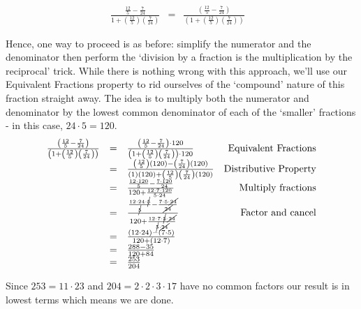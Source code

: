\documentclass{ximera}
\begin{document}
\begin{example}
\begin{enumerate}
\[\begin{array}{rclr}
\frac{\frac{12}{5} - \frac{7}{24}}{1 + \left(\frac{12}{5}\right) \left(\frac{7}{24}\right)} & = & \frac{\left(\frac{12}{5} - \frac{7}{24}\right)}{\left(1 + \left(\frac{12}{5}\right) \left(\frac{7}{24}\right)\right)} & \end{array} \] 

Hence, one way to proceed is as before: simplify the numerator and the denominator then perform the `division by a fraction is the multiplication by the reciprocal' trick.  While there is nothing wrong with this approach, we'll use our Equivalent Fractions property to rid ourselves of the `compound' nature of this fraction straight away.  The idea is to multiply both the numerator and denominator by the lowest common denominator of each of the `smaller' fractions - in this case, $24 \cdot 5 = 120$.\[ \begin{array}{rclr}

 \frac{\left(\frac{12}{5} - \frac{7}{24}\right)}{\left(1 + \left(\frac{12}{5}\right) \left(\frac{7}{24}\right)\right)} & = &\frac{\left(\frac{12}{5} - \frac{7}{24}\right) \cdot 120}{\left(1 + \left(\frac{12}{5}\right) \left(\frac{7}{24}\right)\right) \cdot 120} & \text{Equivalent Fractions}\\  

& = & \frac{\left(\frac{12}{5}\right) (120) - \left(\frac{7}{24}\right) (120)}{(1)(120) + \left(\frac{12}{5}\right) \left(\frac{7}{24}\right)(120)} & \text{Distributive Property} \\ 

& = & \frac{\frac{12 \cdot 120}{5} - \frac{7 \cdot 120}{24}}{120 + \frac{12 \cdot 7 \cdot 120}{5 \cdot 24}} & \text{Multiply fractions} \\  

& = & \frac{\frac{12 \cdot 24 \cdot \cancel{5}}{\cancel{5}} - \frac{7 \cdot 5 \cdot \cancel{24}}{\cancel{24}}}{120 + \frac{12 \cdot 7 \cdot \cancel{5} \cdot \cancel{24}}{\cancel{5} \cdot \cancel{24}}} & \text{Factor and cancel} \\ 
 & = & \frac{(12 \cdot 24) - (7 \cdot 5)}{120 + (12 \cdot 7)} & \\ 
 & = & \frac{288 - 35}{120 + 84} & \\ 
 & = & \frac{253}{204} & \\
  \end{array} \] 
 
Since $253 = 11 \cdot 23$ and $204 = 2 \cdot 2 \cdot 3 \cdot 17$ have no common factors our result is in lowest terms which means we are done.



\end{enumerate}
\end{example}
\end{document}
